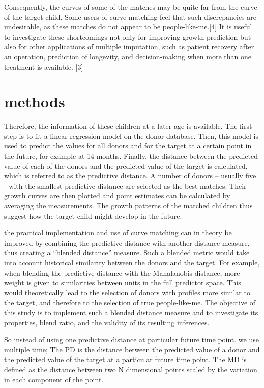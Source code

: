 \documentclass{article}
\begin{document}
Consequently, the curves of some of the matches may be quite far from
the curve of the target child. Some users of curve matching feel that
such discrepancies are undesirable, as these matches do not appear to be
people-like-me.{[}4{]} It is useful to investigate these shortcomings
not only for improving growth prediction but also for other applications
of multiple imputation, such as patient recovery after an operation,
prediction of longevity, and decision-making when more than one
treatment is available. {[}3{]}

\hypertarget{methods}{%
\section{methods}\label{methods}}

Therefore, the information of these children at a later age is
available. The first step is to fit a linear regression model on the
donor database. Then, this model is used to predict the values for all
donors and for the target at a certain point in the future, for example
at 14 months. Finally, the distance between the predicted value of each
of the donors and the predicted value of the target is calculated, which
is referred to as the predictive distance. A number of donors -- usually
five - with the smallest predictive distance are selected as the best
matches. Their growth curves are then plotted and point estimates can be
calculated by averaging the measurements. The growth patterns of the
matched children thus suggest how the target child might develop in the
future.

the practical implementation and use of curve matching can in theory be
improved by combining the predictive distance with another distance
measure, thus creating a ``blended distance'' measure. Such a blended
metric would take into account historical similarity between the donors
and the target. For example, when blending the predictive distance with
the Mahalanobis distance, more weight is given to similarities between
units in the full predictor space. This would theoretically lead to the
selection of donors with profiles more similar to the target, and
therefore to the selection of true people-like-me. The objective of this
study is to implement such a blended distance measure and to investigate
its properties, blend ratio, and the validity of its resulting
inferences.

So instead of using one predictive distance at particular future time
point. we use multiple time; The PD is the distance between the
predicted value of a donor and the predicted value of the target at a
particular future time point. The MD is defined as the distance between
two N dimensional points scaled by the variation in each component of
the point.
\end{document}
